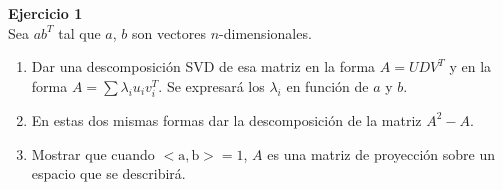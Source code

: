 \documentclass[a4paper, 11pt]{article}
\newenvironment{problem}[2][Ejercicio]
{ \begin{mdframed}[backgroundcolor= red!50] \textbf{#1 #2} \\}
	{  \end{mdframed}}
\begin{document}
	\setlength{\parskip}{\medskipamount}
	\setlength{\parindent}{0pt}
 
\begin{problem}{1}
Sea $ab^T$ tal que $a$, $b$ son vectores $n$-dimensionales.
\begin{enumerate}
\item Dar una descomposición SVD de esa matriz en la forma $A = UDV^T$ y en la forma $A = \sum \lambda_i u_iv^T_i$. Se expresará los $\lambda_i$ en función de $a$ y $b$.
\item En estas dos mismas formas dar la descomposición de la matriz $A^2 - A$.
\item Mostrar que cuando $< \text{a},\text{b}> = 1 $, $A$ es una matriz de proyección sobre un espacio que se describirá.
\end{enumerate}

\end{problem}
\end{document}
